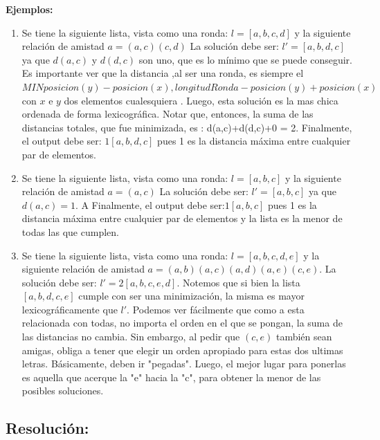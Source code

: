 \documentclass[10pt, a4paper]{article}
\begin{document}
\begin{flushleft}
\textbf{Ejemplos:}\\
\end{flushleft}
\begin{enumerate}

\item

Se tiene la siguiente lista, vista como una ronda:
$l =  [a, b, c, d]$ y la siguiente relación de amistad $a = {(a,c)(c,d)}$
La solución debe ser: $l' = [a, b, d, c]$ ya que $d(a,c)$  y $d(d,c)$ son uno, que es lo mínimo que se puede conseguir. Es importante ver que la distancia
,al ser una ronda, es siempre el $MIN{posicion(y) - posicion(x),longitudRonda - posicion(y) +posicion(x)}$ con $x$ e $y$  dos elementos cualesquiera .
Luego, esta solución es la mas chica ordenada de forma lexicográfica.
Notar que, entonces, la suma de las distancias totales, que fue minimizada, es : d(a,c)+d(d,c)+0 = 2.
Finalmente, el output debe ser: $1 [a, b, d, c]$ pues 1 es la distancia máxima entre cualquier par de elementos.

\item
Se tiene la siguiente lista, vista como una ronda:
$l = [a, b, c]$ y la siguiente relación de amistad $a = {(a,c)}$
La solución debe ser: $l' = [a,b,c]$ ya que $d(a,c) = 1$. A
Finalmente, el output debe ser:$ 1 [a, b, c]$ pues 1 es la distancia máxima entre cualquier par de elementos y la lista es la menor de todas las que cumplen.

\item
Se tiene la siguiente lista, vista como una ronda:
$l = [a,b,c,d,e]$ y la siguiente relación de amistad $a = {(a,b)(a,c)(a,d)(a,e)(c,e)}$.
La solución debe ser: $l' = 2 [a,b,c,e,d]$. Notemos que si bien la lista $[a,b,d,c,e]$ cumple con ser una minimización, la misma es mayor lexicográficamente que $l'$. Podemos ver fácilmente que como a esta relacionada con todas, no importa el orden en el que se pongan, la suma de las distancias no cambia. Sin embargo, al pedir que $(c,e)$ también sean amigas, obliga a tener que elegir un orden apropiado para estas dos ultimas letras. Básicamente, deben ir "pegadas". Luego, el mejor lugar para ponerlas es aquella que acerque la "e" hacia la "c", para obtener la menor de las posibles soluciones.

\end{enumerate}
\subsection{Resolución:} 
\end{document}
